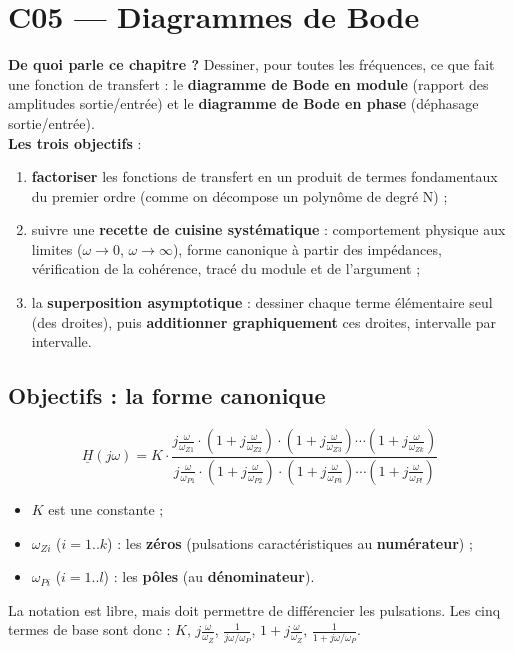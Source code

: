 \chapter{C05 --- Diagrammes de Bode}

\begin{rembox}[title=En bref]
\textbf{De quoi parle ce chapitre ?} Dessiner, pour toutes les fréquences, ce que fait une
fonction de transfert : le \textbf{diagramme de Bode en module} (rapport des amplitudes
sortie/entrée) et le \textbf{diagramme de Bode en phase} (déphasage sortie/entrée). \\
\textbf{Les trois objectifs} :
\begin{enumerate}
  \item \textbf{factoriser} les fonctions de transfert en un produit de termes fondamentaux
        du premier ordre (comme on décompose un polynôme de degré N) ;
  \item suivre une \textbf{recette de cuisine systématique} : comportement physique aux
        limites ($\omega\to0$, $\omega\to\infty$), forme canonique à partir des impédances,
        vérification de la cohérence, tracé du module et de l'argument ;
  \item la \textbf{superposition asymptotique} : dessiner chaque terme élémentaire seul (des
        droites), puis \textbf{additionner graphiquement} ces droites, intervalle par
        intervalle.
\end{enumerate}
\end{rembox}

\section{Objectifs : la forme canonique}


\begin{defnbox}[title=Forme canonique (cinq termes du premier ordre)]
\[ \underline H(j\omega) = K\cdot
   \frac{j\frac{\omega}{\omega_{Z1}}\cdot\left(1 + j\frac{\omega}{\omega_{Z2}}\right)\cdot
         \left(1 + j\frac{\omega}{\omega_{Z3}}\right)\cdots\left(1 + j\frac{\omega}{\omega_{Zk}}\right)}
        {j\frac{\omega}{\omega_{P1}}\cdot\left(1 + j\frac{\omega}{\omega_{P2}}\right)\cdot
         \left(1 + j\frac{\omega}{\omega_{P3}}\right)\cdots\left(1 + j\frac{\omega}{\omega_{Pl}}\right)} \]
\begin{itemize}
  \item $K$ est une constante ;
  \item $\omega_{Zi}$ ($i = 1..k$) : les \textbf{zéros} (pulsations caractéristiques au
        \textbf{numérateur}) ;
  \item $\omega_{Pi}$ ($i = 1..l$) : les \textbf{pôles} (au \textbf{dénominateur}).
\end{itemize}
La notation est libre, mais doit permettre de différencier les pulsations. Les cinq termes
de base sont donc : $K$, $j\frac\omega{\omega_Z}$, $\frac1{j\omega/\omega_P}$,
$1 + j\frac\omega{\omega_Z}$, $\frac1{1 + j\omega/\omega_P}$.
\end{defnbox}

